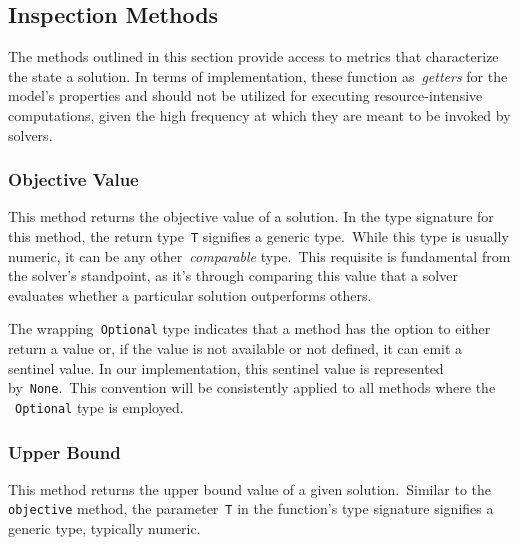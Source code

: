 \subsection{Inspection Methods}

The methods outlined in this section provide access to metrics that characterize
the state a solution. In terms of implementation, these function
as~\emph{getters} for the model's properties and should not be utilized for
executing resource-intensive computations, given the high frequency at which
they are meant to be invoked by solvers.

\subsubsection*{Objective Value}

\begin{center}
\end{center}

This method returns the objective value of a solution. In the type signature for
this method, the return type~\texttt{T} signifies a generic type.~While this
type is usually numeric, it can be any other~\emph{comparable} type.~This
requisite is fundamental from the solver's standpoint, as it's through comparing
this value that a solver evaluates whether a particular solution outperforms
others.

The wrapping~\texttt{Optional} type indicates that a method has the option to
either return a value or, if the value is not available or not defined, it can
emit a sentinel value. In our implementation, this sentinel value is represented
by~\texttt{None}.~This convention will be consistently applied to all methods
where the ~\texttt{Optional} type is employed.

\subsubsection*{Upper Bound}

\begin{center}
\end{center}

This method returns the upper bound value of a given solution.~Similar to the
\texttt{objective} method, the parameter~\texttt{T} in the function's type
signature signifies a generic type, typically numeric.


